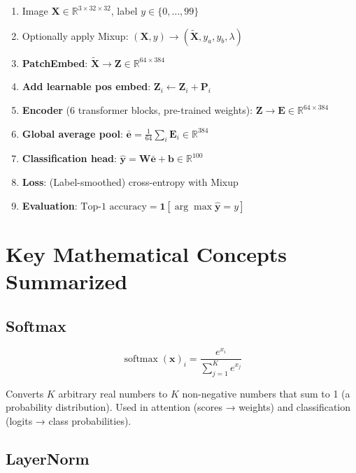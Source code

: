 \documentclass[12pt, a4paper]{report}
\newcommand{\R}{\mathbb{R}}
\newcommand{\softmax}{\operatorname{softmax}}
\newcommand{\mat}[1]{\mathbf{#1}}
\newcommand{\vect}[1]{\bm{#1}}
\begin{document}
\begin{enumerate}
    \item Image $\mat{X} \in \R^{3 \times 32 \times 32}$, label $y \in \{0, \ldots, 99\}$
    \item Optionally apply Mixup: $(\mat{X}, y) \to (\tilde{\mat{X}}, y_a, y_b, \lambda)$
    \item \textbf{PatchEmbed}: $\tilde{\mat{X}} \to \mat{Z} \in \R^{64 \times 384}$
    \item \textbf{Add learnable pos embed}: $\mat{Z}_i \leftarrow \mat{Z}_i + \mat{P}_i$
    \item \textbf{Encoder} (6 transformer blocks, pre-trained weights): $\mat{Z} \to \mat{E} \in \R^{64 \times 384}$
    \item \textbf{Global average pool}: $\bar{\vect{e}} = \frac{1}{64}\sum_i \mat{E}_i \in \R^{384}$
    \item \textbf{Classification head}: $\hat{\vect{y}} = \mat{W}\bar{\vect{e}} + \vect{b} \in \R^{100}$
    \item \textbf{Loss}: (Label-smoothed) cross-entropy with Mixup
    \item \textbf{Evaluation}: $\text{Top-1 accuracy} = \mathbf{1}[\arg\max \hat{\vect{y}} = y]$
\end{enumerate}

\chapter{Key Mathematical Concepts Summarized}

\section{Softmax}

\begin{equation}
\softmax(\vect{x})_i = \frac{e^{x_i}}{\sum_{j=1}^{K} e^{x_j}}
\end{equation}

Converts $K$ arbitrary real numbers to $K$ non-negative numbers that sum to 1 (a probability distribution). Used in attention (scores → weights) and classification (logits → class probabilities).

\section{LayerNorm}
\end{document}

